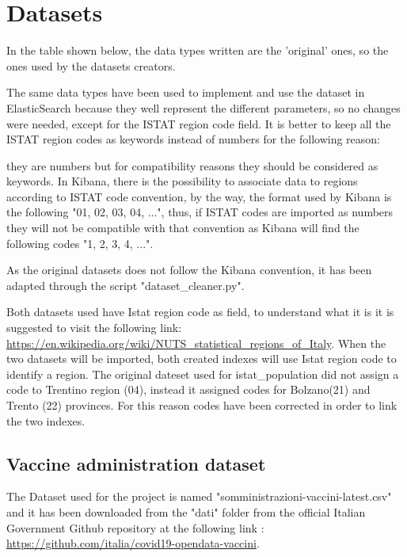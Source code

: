 \documentclass{article}
\begin{document}
\hfill\break
\newpage

\newpage
\section{Datasets}
In the table shown below, the data types written are the 'original' ones, so the ones used by the datasets creators. 

The same data types have been used to implement and use the dataset in ElasticSearch because they well represent the different parameters, so no changes were needed, except for the ISTAT region code field.
It is better to keep all the ISTAT region codes as keywords instead of numbers for the following reason:

they are numbers but for compatibility reasons they should be considered as keywords. In Kibana, there is the possibility to associate data to regions according to ISTAT code convention, by the way, the format used by Kibana is the following "01, 02, 03, 04, ...", thus, if ISTAT codes are imported as numbers they will not be compatible with that convention as Kibana will find the following codes "1, 2, 3, 4, ...".

As the original datasets does not follow the Kibana convention, it has been adapted through the script {\selectfont"dataset\_cleaner.py"}.

\hfill\break
\hfill\break
Both datasets used have Istat region code as field, to understand what it is it is suggested to visit the following link: \\ \url{https://en.wikipedia.org/wiki/NUTS\_statistical\_regions\_of\_Italy}.
\hfill\break
\hfill\break
\hfill\break
When the two datasets will be imported, both created indexes will use Istat region code to identify a region. The original dateset used for istat\_population did not assign a code to Trentino region (04), instead it assigned codes for Bolzano(21) and Trento (22) provinces. For this reason codes have been corrected in order to link the two indexes.

\newpage
\subsection{Vaccine administration dataset}
The Dataset used for the project is named {\selectfont"somministrazioni-vaccini-latest.csv"} and it has been downloaded from the {\selectfont"dati"} folder from the official Italian Government Github repository at the following link :\\ \url{https://github.com/italia/covid19-opendata-vaccini}.
\end{document}
